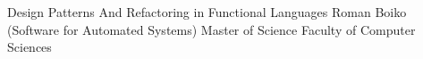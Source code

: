\documentclass[dvips,letterpaper,12pt]{report}
\begin{document}


\thesistitle
	{Design Patterns And Refactoring in Functional Languages}
	{Roman Boiko}
	{(Software for Automated Systems)}
	{Master of Science}
	{Faculty of Computer Sciences}




%












\appendix

\end{document}
